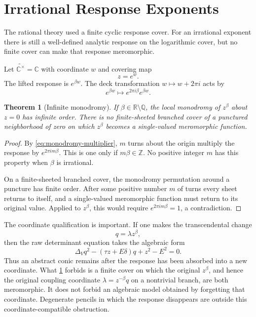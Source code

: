 \documentclass[11pt,reqno]{amsart}
\newtheorem{theorem}{Theorem}[section]
\theoremstyle{remark}
\newcommand{\C}{\mathbb C}
\newcommand{\R}{\mathbb R}
\newcommand{\Q}{\mathbb Q}
\newcommand{\Z}{\mathbb Z}
\begin{document}
\section{Irrational Response Exponents}\label{sec:irrational}

The rational theory used a finite cyclic response cover.  For an irrational
exponent there is still a well-defined analytic response on the logarithmic
cover, but no finite cover can make that response meromorphic.

Let $\widetilde{\C^\times}=\C$ with coordinate $w$ and covering map
\begin{equation}\label{eq:log-cover}
 z=e^w.
\end{equation}
The lifted response is $e^{\beta w}$.  The deck transformation
$w\mapsto w+2\pi i$ acts by
\begin{equation}\label{eq:monodromy-multiplier}
 e^{\beta w}\longmapsto e^{2\pi i\beta}e^{\beta w}.
\end{equation}

\begin{theorem}[Infinite monodromy]\label{thm:irrational-monodromy}
If $\beta\in\R\setminus\Q$, the local monodromy of $z^\beta$ about $z=0$
has infinite order.  There is no finite-sheeted branched cover of a punctured
neighborhood of zero on which $z^\beta$ becomes a single-valued meromorphic
function.
\end{theorem}

\begin{proof}
By \eqref{eq:monodromy-multiplier}, $m$ turns about the origin multiply the
response by $e^{2\pi im\beta}$.  This is one only if $m\beta\in\Z$.  No
positive integer $m$ has this property when $\beta$ is irrational.

On a finite-sheeted branched cover, the monodromy permutation around a
puncture has finite order.  After some positive number $m$ of turns every
sheet returns to itself, and a single-valued meromorphic function must return
to its original value.  Applied to $z^\beta$, this would require
$e^{2\pi im\beta}=1$, a contradiction.
\end{proof}

The coordinate qualification is important.  If one makes the transcendental
change
\begin{equation}\label{eq:irrational-q-coordinate}
 q=\lambda z^\beta,
\end{equation}
then the raw determinant equation takes the algebraic form
\begin{equation}\label{eq:irrational-abstract-conic}
 \Delta_Vq^2-(\tau z+E\delta)q+z^2-E^2=0.
\end{equation}
Thus an abstract conic remains after the response has been absorbed into a
new coordinate.  What \cref{thm:irrational-monodromy} forbids is a finite
cover on which the original $z^\beta$, and hence the original coupling
coordinate $\lambda=z^{-\beta}q$ on a nontrivial branch, are both meromorphic.
It does not forbid an algebraic model obtained by forgetting that coordinate.
Degenerate pencils in which the response disappears are outside this
coordinate-compatible obstruction.
\end{document}
